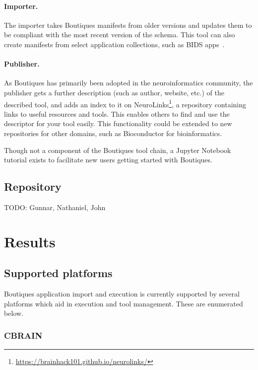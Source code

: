 \documentclass{article}
\newcommand{\todo}[1]{\color{red}TODO: #1\color{black}}
\newcommand{\boutiques}{Boutiques\xspace}
\begin{document}
\paragraph{Importer.} The importer takes \boutiques manifests from older versions and
updates them to be compliant with the most recent version of the schema. This tool can
also create manifests from select application collections, such as BIDS
apps~\cite{gorgolewski2017bids}.

\paragraph{Publisher.} As \boutiques has primarily been adopted in the neuroinformatics
community, the publisher gets a further description (such as author, website, etc.) of
the described tool, and adds an index to it on
NeuroLinks\footnote{\url{https://brainhack101.github.io/neurolinks/}}, a repository
containing links to useful resources and tools. This enables others to find and use the
descriptor for your tool easily. This functionality could be extended to
new repositories for other domains, such as Bioconductor for bioinformatics.

Though not a component of the \boutiques tool chain, a Jupyter Notebook tutorial exists
to facilitate new users getting started with \boutiques.

\subsection{Repository}
\todo{Gunnar, Nathaniel, John}

\section{Results}
\label{sec:results}

\subsection{Supported platforms}

\boutiques application import and execution is currently supported by several
platforms which aid in execution and tool management. These are enumerated
below.

\subsubsection{CBRAIN}
\end{document}
